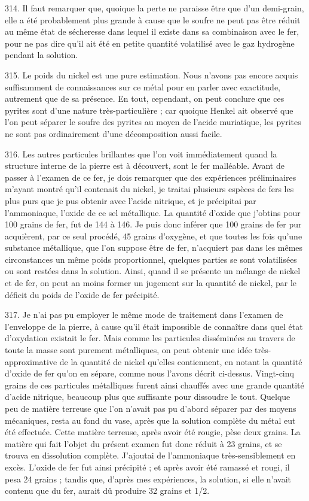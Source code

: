 \documentclass[a4paper, 11pt, oneside, polutonikogreek, french]{article}
\begin{document}
314. Il faut remarquer que, quoique la perte ne paraisse être que d'un demi-grain, elle a été probablement plus grande à cause que le soufre ne peut pas être réduit au même état de sécheresse dans lequel il existe dans sa combinaison avec le fer, pour ne pas dire qu'il ait été en petite quantité volatilisé avec le gaz hydrogène pendant la solution.

315. Le poids du nickel est une pure estimation. Nous n'avons pas encore acquis suffisamment de connaissances sur ce métal pour en parler avec exactitude, autrement que de sa présence. En tout, cependant, on peut conclure que ces pyrites sont d'une nature très-particulière ; car quoique Henkel ait observé que l'on peut séparer le soufre des pyrites au moyen de l'acide muriatique, les pyrites ne sont pas ordinairement d'une décomposition aussi facile.

316. Les autres particules brillantes que l'on voit immédiatement quand la structure interne de la pierre est à découvert, sont le fer malléable. Avant de passer à l'examen de ce fer, je dois remarquer que des expériences préliminaires m'ayant montré qu'il contenait du nickel, je traitai plusieurs espèces de fers les plus purs que je pus obtenir avec l'acide nitrique, et je précipitai par l'ammoniaque, l'oxide de ce sel métallique. La quantité d'oxide que j'obtins pour 100 grains de fer, fut de 144 à 146. Je puis donc inférer que 100 grains de fer pur acquièrent, par ce seul procédé, 45 grains d'oxygène, et que toutes les fois qu'une substance métallique, que l'on suppose être de fer, n'acquiert pas dans les mêmes circonstances un même poids proportionnel, quelques parties se sont volatilisées ou sont restées dans la solution. Ainsi, quand il se présente un mélange de nickel et de fer, on peut an moins former un jugement sur la quantité de nickel, par le déficit du poids de l'oxide de fer précipité.

317. Je n'ai pas pu employer le même mode de traitement dans l'examen de l'enveloppe de la pierre, à cause qu'il était impossible de connaître dans quel état d'oxydation existait le fer. Mais comme les particules disséminées au travers de toute la masse sont purement métalliques, on peut obtenir une idée très-approximative de la quantité de nickel qu'elles contiennent, en notant la quantité d'oxide de fer qu'on en sépare, comme nous l'avons décrit ci-dessus. Vingt-cinq grains de ces particules métalliques furent ainsi chauffés avec une grande quantité d'acide nitrique, beaucoup plus que suffisante pour dissoudre le tout. Quelque peu de matière terreuse que l'on n'avait pas pu d'abord séparer par des moyens mécaniques, resta au fond du vase, après que la solution complète du métal eut été effectuée. Cette matière terreuse, après avoir été rougie, pèse deux grains. La matière qui fait l'objet du présent examen fut donc réduit à 23 grains, et se trouva en dissolution complète. J'ajoutai de l'ammoniaque très-sensiblement en excès. L'oxide de fer fut ainsi précipité ; et après avoir été ramassé et rougi, il pesa 24 grains ; tandis que, d'après mes expériences, la solution, si elle n'avait contenu que du fer, aurait dû produire 32 grains et 1/2.
\end{document}
